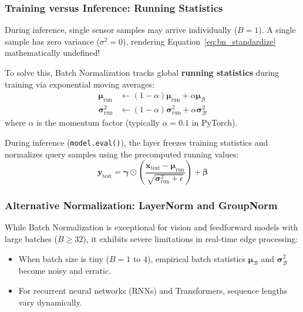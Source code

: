 \subsubsection{Training versus Inference: Running Statistics}

During inference, single sensor samples may arrive individually ($B = 1$). A single sample has zero variance ($\sigma^2 = 0$), rendering Equation~\eqref{eq:bn_standardize} mathematically undefined!

To solve this, Batch Normalization tracks global \textbf{running statistics} during training via exponential moving averages:
\begin{align}
\boldsymbol{\mu}_{\text{run}} &\leftarrow (1 - \alpha) \boldsymbol{\mu}_{\text{run}} + \alpha \boldsymbol{\mu}_{\mathcal{B}}\label{eq:running_mean} \\
\boldsymbol{\sigma}^2_{\text{run}} &\leftarrow (1 - \alpha) \boldsymbol{\sigma}^2_{\text{run}} + \alpha \boldsymbol{\sigma}^2_{\mathcal{B}}\label{eq:running_var}
\end{align}
where $\alpha$ is the momentum factor (typically $\alpha = 0.1$ in PyTorch).

During inference (\texttt{model.eval()}), the layer freezes training statistics and normalizes query samples using the precomputed running values:
\begin{equation}
\mathbf{y}_{\text{test}} = \boldsymbol{\gamma} \odot \left( \frac{\mathbf{x}_{\text{test}} - \boldsymbol{\mu}_{\text{run}}}{\sqrt{\boldsymbol{\sigma}^2_{\text{run}} + \epsilon}} \right) + \boldsymbol{\beta}\label{eq:bn_inference}
\end{equation}

\subsubsection{Alternative Normalization: LayerNorm and GroupNorm}

While Batch Normalization is exceptional for vision and feedforward models with large batches ($B \ge 32$), it exhibits severe limitations in real-time edge processing:
\begin{itemize}
    \item When batch size is tiny ($B = 1\text{ to }4$), empirical batch statistics $\boldsymbol{\mu}_{\mathcal{B}}$ and $\boldsymbol{\sigma}^2_{\mathcal{B}}$ become noisy and erratic.
    \item For recurrent neural networks (RNNs) and Transformers, sequence lengths vary dynamically.
\end{itemize}

